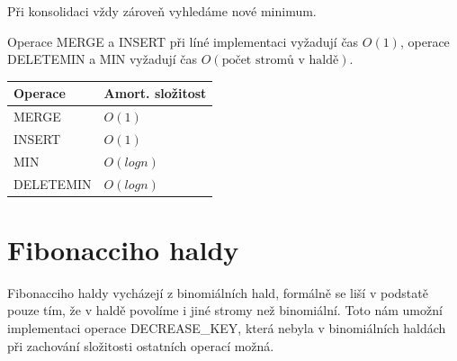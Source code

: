 Při konsolidaci vždy zároveň vyhledáme nové minimum.

\begin{theorem}
Operace MERGE a INSERT při líné implementaci vyžadují čas $O(1)$, operace
DELETEMIN a MIN vyžadují čas $O(\text{počet stromů v haldě})$.
\end{theorem}

%

\vspace{5mm}

\begin{center}
\begin{tabular}{|l|l|}
\hline
Operace & Amort. složitost \\
\hline
MERGE & $O(1)$ \\
INSERT & $O(1)$ \\
MIN & $O(log n)$ \\
DELETEMIN & $O(log n)$ \\
\hline
\end{tabular}
\label{tab:binheaps.lazy.complexity}
\end{center}



\section{Fibonacciho haldy}

Fibonacciho haldy vycházejí z binomiálních hald, formálně se liší v podstatě
pouze tím, že v haldě povolíme i jiné stromy než binomiální. Toto nám
umožní implementaci operace DECREASE\_KEY, která nebyla v binomiálních
haldách při zachování složitosti ostatních operací možná.

